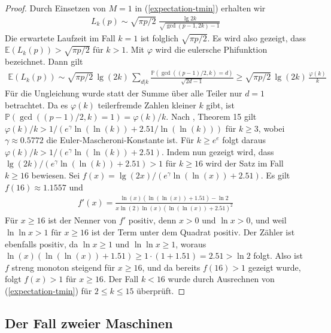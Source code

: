 \documentclass[a4paper, 11pt, ngerman]{article}
\newcommand{\E}{\mathbb{E}}
\renewcommand{\P}{\mathbb{P}}
\theoremstyle{definition}
\theoremstyle{plain}
\theoremstyle{remark}
\begin{document}
\begin{proof}
    Durch Einsetzen von $M = 1$ in (\ref{expectation-tmin}) erhalten wir
    \begin{align*}
        L_k(p) \sim \sqrt {\pi p / 2} \;
        \frac {\lg 2k} {\sqrt{\gcd(p - 1, 2k) - 1}}
    \end{align*}
    Die erwartete Laufzeit im Fall $k = 1$ ist folglich $\sqrt{\pi p/2}$. Es wird also gezeigt, dass $\E(L_k(p)) > \sqrt{\pi p / 2}$ für $k > 1$. Mit $\varphi$ wird die eulersche Phifunktion bezeichnet. Dann gilt
    \begin{align*}
        \E(L_k(p))
        \sim \sqrt{\pi p / 2} \, \lg (2k) \,
        \sum_{d | k} \frac {\P(\gcd((p - 1)/2, k) = d)}
        { \sqrt {2d - 1}} \nonumber
        \ge \sqrt{\pi p / 2} \, \lg (2k) \, \frac {\varphi(k)} k
    \end{align*}
    Für die Ungleichung wurde statt der Summe über alle Teiler nur $d = 1$ betrachtet. Da es $\varphi(k)$ teilerfremde Zahlen kleiner $k$ gibt, ist $\P(\gcd((p - 1)/2, k) = 1) = \varphi(k)/k$. Nach \cite{rs62}, Theorem 15 gilt $ \varphi(k) / k > 1 / (e^\gamma \ln (\ln (k)) + 2.51 / \ln (\ln (k)))$ für $k \ge 3$, wobei $\gamma \approx 0.5772$ die Euler-Mascheroni-Konstante ist. Für $k \ge e^e$ folgt daraus $\varphi(k) / k > 1/(e^\gamma \ln(\ln(k)) + 2.51)$. Indem nun gezeigt wird, dass $\lg (2k) / (e^\gamma \ln (\ln (k)) + 2.51) > 1$ für $k \ge 16$ wird der Satz im Fall $k \ge 16$ bewiesen. Sei $f(x) = \lg (2x) / (e^\gamma \ln (\ln (x)) + 2.51)$. Es gilt $f(16) \approx 1.1557$ und
    \begin{align*}
        f'(x)
        = \frac {\ln (x)(\ln (\ln (x)) + 1.51) - \ln 2}
        {x \ln (2) \ln (x)(\ln(\ln(x)) + 2.51)^2}
    \end{align*}
    Für $x \ge 16$ ist der Nenner von $f'$ positiv, denn $x > 0$ und $\ln x > 0$, und weil $\ln \ln x > 1$ für $x \ge 16$ ist der Term unter dem Quadrat positiv. Der Zähler ist ebenfalls positiv, da $\ln x \ge 1$ und $\ln \ln x \ge 1$, woraus $\ln(x)(\ln(\ln(x)) + 1.51) \ge 1 \cdot (1 + 1.51) = 2.51 > \ln 2$ folgt. Also ist $f$ streng monoton steigend für $x \ge 16$, und da bereits $f(16) > 1$ gezeigt wurde, folgt $f(x) > 1$ für $x \ge 16$. Der Fall $k < 16$ wurde durch Ausrechnen von (\ref{expectation-tmin}) für $2 \le k \le 15$ überprüft.
\end{proof}

\subsection{Der Fall zweier Maschinen}
\end{document}
